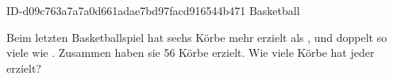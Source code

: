 \begin{exercise}
      {ID-d09c763a7a7a0d661adae7bd97facd916544b471}
      {Basketball}
  \ifproblem\problem\par
    Beim letzten Basketballspiel hat \xya{} sechs Körbe mehr erzielt als \xyb,
    und \xyb{} doppelt so viele wie \xyc. Zusammen haben sie 56 Körbe erzielt.
    Wie viele Körbe hat jeder erzielt?
  \fi
\end{exercise}
